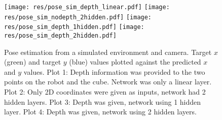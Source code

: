 \begin{figure}[h!]
    \centering
    \texttt{[image: res/pose\_sim\_depth\_linear.pdf]}
    \texttt{[image: res/pose\_sim\_nodepth\_2hidden.pdf]}
    \texttt{[image: res/pose\_sim\_depth\_1hidden.pdf]}
    \texttt{[image: res/pose\_sim\_depth\_2hidden.pdf]}

    \caption{Pose estimation from a simulated environment and camera. Target
    $x$ (green) and target $y$ (blue) values plotted against the predicted
    $x$ and $y$ values.  Plot 1: Depth information was provided to the two
    points on the robot and the cube. Network was only a linear layer. Plot 2:
    Only 2D coordinates were given as inputs, network had 2 hidden layers.
    Plot 3: Depth was given, network using 1 hidden layer.  Plot 4: Depth was
    given, network using 2 hidden layers.}

    \label{fig:pose-sim-corr}
    
\end{figure}
